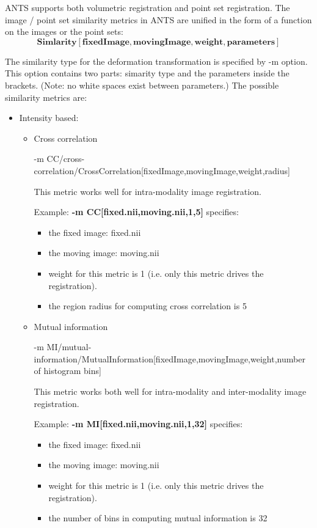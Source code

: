 ANTS supports both volumetric registration and point set registration. The image / point set similarity metrics in ANTS are unified in the form of a function on the images or the point sets:
$$\textbf{Simlarity}[\textbf{fixedImage}, \textbf{movingImage}, \textbf{weight}, \textbf{parameters}]$$

The similarity type for the deformation transformation is specified by -m option. This option contains two parts: simarity type and the parameters inside the brackets. (Note: no white spaces exist between parameters.) The possible similarity metrics are: 
\begin{itemize}
 \item Intensity based:
    \begin{itemize}
        \item Cross correlation

        -m CC/cross-correlation/CrossCorrelation[fixedImage,movingImage,weight,radius]        
        
        This metric works well for intra-modality image registration. 
        
        Example: \textbf{-m CC[fixed.nii,moving.nii,1,5]} specifies:
            \begin{itemize}
             \item the fixed image: fixed.nii
             \item the moving image: moving.nii             
             \item weight for this metric is 1 (i.e. only this metric drives the registration).      \item the region radius for computing cross correlation is 5
            \end{itemize}

        \item Mutual information

        -m MI/mutual-information/MutualInformation[fixedImage,movingImage,weight,number of histogram bins]
        
        This metric works both well for intra-modality and inter-modality image registration. 
        
        Example: \textbf{-m MI[fixed.nii,moving.nii,1,32]} specifies:
            \begin{itemize}
             \item the fixed image: fixed.nii
             \item the moving image: moving.nii             
             \item weight for this metric is 1 (i.e. only this metric drives the registration).      \item the number of bins in computing mutual information is 32
            \end{itemize}
                     

\end{itemize}
\end{itemize}
